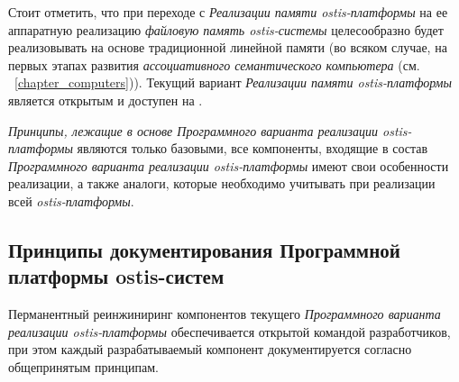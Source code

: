 Стоит отметить, что при переходе с \textit{Реализации памяти ostis-платформы} на ее аппаратную реализацию \textit{файловую память ostis-системы} целесообразно будет реализовывать на основе традиционной линейной памяти (во всяком случае, на первых этапах развития \textit{ассоциативного семантического компьютера} (см. ~\ref{chapter_computers})). Текущий вариант \textit{Реализации памяти ostis-платформы} является открытым и доступен на .

\textit{Принципы, лежащие в основе Программного варианта реализации ostis-платформы} являются только базовыми, все компоненты, входящие в состав \textit{Программного варианта реализации ostis-платформы} имеют свои особенности реализации, а также аналоги, которые необходимо учитывать при реализации всей \textit{ostis-платформы}.

\subsection{Принципы документирования Программной платформы ostis-систем}
\label{sec_soft_platform_doc_principles}

Перманентный реинжиниринг компонентов текущего \textit{Программного варианта реализации ostis-платформы} обеспечивается открытой командой разработчиков, при этом каждый разрабатываемый компонент документируется согласно общепринятым принципам.

